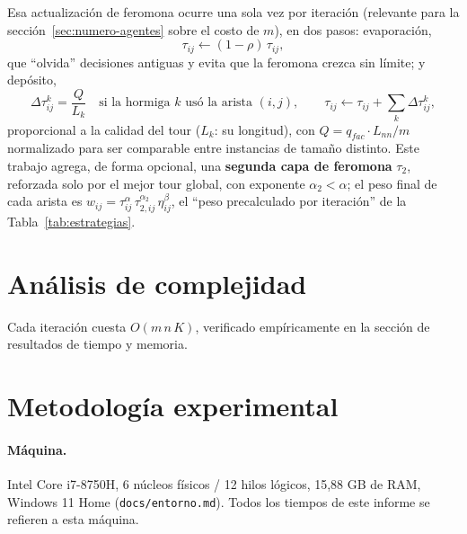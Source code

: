 \documentclass[12pt,a4paper]{article}
\begin{document}
Esa actualización de feromona ocurre una sola vez por iteración (relevante
para la sección~\ref{sec:numero-agentes} sobre el costo de $m$), en dos
pasos: evaporación,
\begin{equation}
\tau_{ij} \leftarrow (1-\rho)\,\tau_{ij},
\label{eq:evaporacion}
\end{equation}
que ``olvida'' decisiones antiguas y evita que la feromona crezca sin
límite; y depósito,
\begin{equation}
\Delta\tau^k_{ij} = \frac{Q}{L_k} \quad \text{si la hormiga $k$ usó la
arista $(i,j)$}, \qquad \tau_{ij} \leftarrow \tau_{ij} + \sum_k
\Delta\tau^k_{ij},
\label{eq:deposito}
\end{equation}
proporcional a la calidad del tour ($L_k$: su longitud), con
$Q = q_{fac} \cdot L_{nn}/m$ normalizado para ser comparable entre
instancias de tamaño distinto. Este trabajo
agrega, de forma opcional, una \textbf{segunda capa de feromona} $\tau_2$,
reforzada solo por el mejor tour global, con exponente $\alpha_2 < \alpha$;
el peso final de cada arista es
$w_{ij} = \tau_{ij}^{\alpha}\,\tau_{2,ij}^{\alpha_2}\,\eta_{ij}^{\beta}$, el
``peso precalculado por iteración'' de la Tabla~\ref{tab:estrategias}.



\section{Análisis de complejidad}
\label{sec:complejidad}
Cada iteración cuesta $O(m\,n\,K)$, verificado empíricamente en la sección
de resultados de tiempo y memoria.

\section{Metodología experimental}
\label{sec:metodologia}
\paragraph{Máquina.} Intel Core i7-8750H, 6 núcleos físicos / 12 hilos
lógicos, 15,88 GB de RAM, Windows 11 Home (\texttt{docs/entorno.md}). Todos
los tiempos de este informe se refieren a esta máquina.
\end{document}
